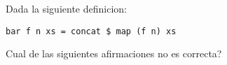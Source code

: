 \documentclass{gift}
\begin{document}
\begin{giftFragmento}
\end  {giftFragmento}


\begin{giftComentario}
 
\end  {giftComentario}

\begin{giftComentario}
 
\end  {giftComentario}
\begin{giftFragmento}
Dada la siguiente definicion:\end  {giftFragmento}

\verb!bar f n xs = concat $ map (f n) xs!
\begin{giftFragmento}
Cual de las siguientes afirmaciones no es correcta?\end  {giftFragmento}
\end{document}
